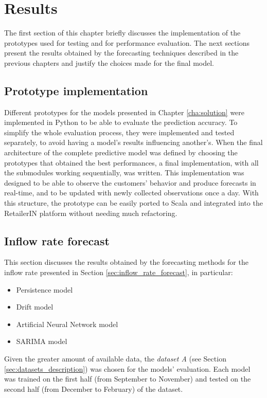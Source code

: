 \chapter{Results}
\label{cha:results}

The first section of this chapter briefly discusses the implementation of the prototypes used for testing and for performance evaluation. The next sections present the results obtained by the forecasting techniques described in the previous chapters and justify the choices made for the final model.

\section{Prototype implementation}
\label{sec:prototype_implementation}

Different prototypes for the models presented in Chapter \ref{cha:solution} were implemented in Python to be able to evaluate the prediction accuracy. To simplify the whole evaluation process, they were implemented and tested separately, to avoid having a model’s results influencing another’s. When the final architecture of the complete predictive model was defined by choosing the prototypes that obtained the best performances, a final implementation, with all the submodules working sequentially, was written. This implementation was designed to be able to observe the customers' behavior and produce forecasts in real-time, and to be updated with newly collected observations once a day. With this structure, the prototype can be easily ported to Scala and integrated into the RetailerIN platform without needing much refactoring.

\section{Inflow rate forecast}
\label{sec:inflow_rate_forecast_results}

This section discusses the results obtained by the forecasting methods for the inflow rate presented in Section \ref{sec:inflow_rate_forecast}, in particular:
\begin{itemize}
  \item Persistence model
  \item Drift model
  \item Artificial Neural Network model
  \item SARIMA model
\end{itemize}

Given the greater amount of available data, the \emph{dataset A} (see Section \ref{sec:datasets_description}) was chosen for the models' evaluation. Each model was trained on the first half (from September to November) and tested on the second half (from December to February) of the dataset.

